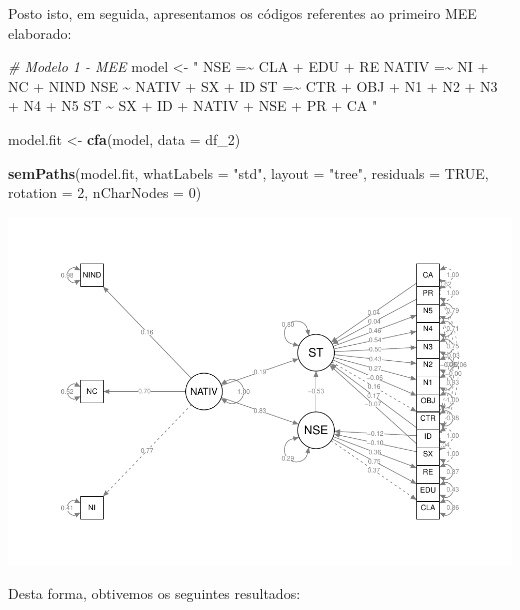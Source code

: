 \documentclass[
  12pt,
]{article}
\newenvironment{Shaded}{\begin{snugshade}}{\end{snugshade}}
\newcommand{\CommentTok}[1]{\textcolor[rgb]{0.56,0.35,0.01}{\textit{#1}}}
\newcommand{\DataTypeTok}[1]{\textcolor[rgb]{0.13,0.29,0.53}{#1}}
\newcommand{\DecValTok}[1]{\textcolor[rgb]{0.00,0.00,0.81}{#1}}
\newcommand{\KeywordTok}[1]{\textcolor[rgb]{0.13,0.29,0.53}{\textbf{#1}}}
\newcommand{\NormalTok}[1]{#1}
\newcommand{\OtherTok}[1]{\textcolor[rgb]{0.56,0.35,0.01}{#1}}
\newcommand{\StringTok}[1]{\textcolor[rgb]{0.31,0.60,0.02}{#1}}
\begin{document}
Posto isto, em seguida, apresentamos os códigos referentes ao primeiro
MEE elaborado:

\scriptsize
\singlespacing

\begin{Shaded}
\begin{Highlighting}[]
\CommentTok{\# Modelo 1 {-} MEE}
\NormalTok{model \textless{}{-}}\StringTok{ "}
\StringTok{NSE =\textasciitilde{} CLA + EDU + RE}
\StringTok{NATIV =\textasciitilde{} NI + NC + NIND}
\StringTok{NSE \textasciitilde{} NATIV + SX + ID}
\StringTok{ST =\textasciitilde{} CTR + OBJ + N1 + N2 + N3 + N4 + N5}
\StringTok{ST \textasciitilde{} SX + ID + NATIV + NSE + PR + CA}
\StringTok{"}

\NormalTok{model.fit \textless{}{-}}\StringTok{ }\KeywordTok{cfa}\NormalTok{(model, }\DataTypeTok{data =}\NormalTok{ df\_}\DecValTok{2}\NormalTok{)}

\KeywordTok{semPaths}\NormalTok{(model.fit,}
         \DataTypeTok{whatLabels =} \StringTok{"std"}\NormalTok{,}
         \DataTypeTok{layout =} \StringTok{"tree"}\NormalTok{,}
         \DataTypeTok{residuals =} \OtherTok{TRUE}\NormalTok{,}
         \DataTypeTok{rotation =} \DecValTok{2}\NormalTok{,}
         \DataTypeTok{nCharNodes =} \DecValTok{0}\NormalTok{)}
\end{Highlighting}
\end{Shaded}

\includegraphics{trabalho_final_files/figure-latex/unnamed-chunk-2-1.pdf}

\normalsize
\onehalfspacing

Desta forma, obtivemos os seguintes resultados:

\scriptsize
\end{document}
